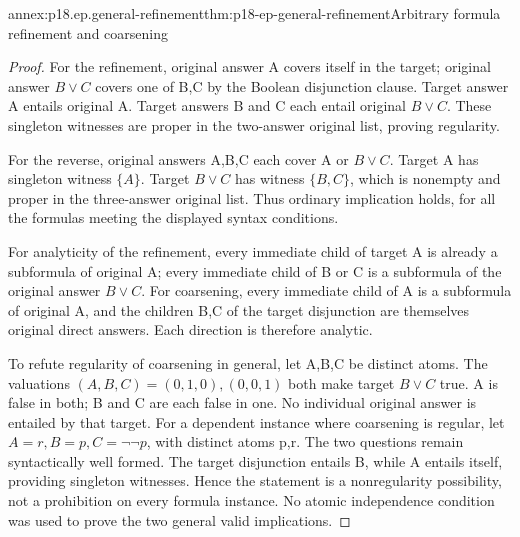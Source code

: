 \begin{annexitem}{annex:p18.ep.general-refinement}{thm:p18-ep-general-refinement}{Arbitrary formula refinement and coarsening}
\begin{proof}
For the refinement, original answer A covers itself in the target;
original answer \(B\lor C\) covers one of B,C by the Boolean
disjunction clause. Target answer A entails original A. Target answers
B and C each entail original \(B\lor C\). These singleton witnesses
are proper in the two-answer original list, proving regularity.

For the reverse, original answers A,B,C each cover A or \(B\lor C\).
Target A has singleton witness \(\{A\}\). Target \(B\lor C\)
has witness \(\{B,C\}\), which is nonempty and proper in the
three-answer original list. Thus ordinary implication holds, for
all the formulas meeting the displayed syntax conditions.

For analyticity of the refinement, every immediate child of target A
is already a subformula of original A; every immediate child of B or
C is a subformula of the original answer \(B\lor C\). For
coarsening, every immediate child of A is a subformula of original A,
and the children B,C of the target disjunction are themselves original
direct answers. Each direction is therefore analytic.

To refute regularity of coarsening in general, let A,B,C be distinct
atoms. The valuations \((A,B,C)=(0,1,0),(0,0,1)\) both make
target \(B\lor C\) true. A is false in both; B and C are each
false in one. No individual original answer is entailed by that target.
For a dependent instance where coarsening is regular, let
\(A=r,B=p,C=\neg\neg p\), with distinct atoms p,r. The two
questions remain syntactically well formed. The target disjunction
entails B, while A entails itself, providing singleton witnesses.
Hence the statement is a nonregularity possibility, not a prohibition
on every formula instance. No atomic independence condition was used
to prove the two general valid implications.
\end{proof}
\end{annexitem}

